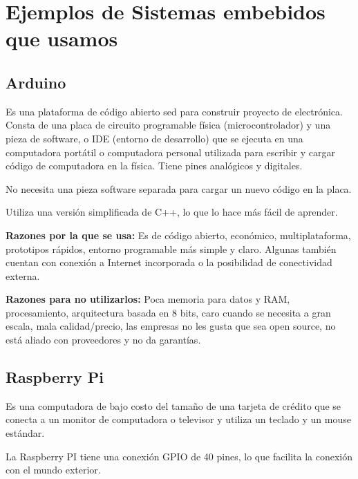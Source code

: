 \documentclass[12pt, twoside, openright]{report} %
\begin{document}
\section{Ejemplos de Sistemas embebidos que usamos}
\subsection{Arduino}

Es una plataforma de código abierto sed para construir proyecto de electrónica.	Consta de una placa de circuito programable física (microcontrolador) y una pieza de software, o IDE (entorno de desarrollo) que se ejecuta en una computadora portátil o computadora personal utilizada para escribir y cargar código de computadora en la física. Tiene pines analógicos y digitales.

No necesita una pieza software separada para cargar un nuevo código en la placa.

Utiliza una versión simplificada de C++, lo que lo hace más fácil de aprender.

\textbf{Razones por la que se usa:} Es de código abierto, económico, multiplataforma, prototipos rápidos, entorno programable más simple y claro. Algunas también cuentan con conexión a Internet incorporada o la posibilidad de conectividad externa.

\textbf{Razones para no utilizarlos:} Poca memoria para datos y RAM, procesamiento, arquitectura basada en 8 bits, caro cuando se necesita a gran escala, mala calidad/precio, las empresas no les gusta que sea open source, no está aliado con proveedores y no da garantías.

\subsection{Raspberry Pi}

Es una computadora de bajo costo del tamaño de una tarjeta de crédito que se conecta a un monitor de computadora o televisor y utiliza un teclado y un mouse estándar.

La Raspberry PI tiene una conexión GPIO de 40 pines, lo que facilita la conexión con el mundo exterior.
\end{document}
